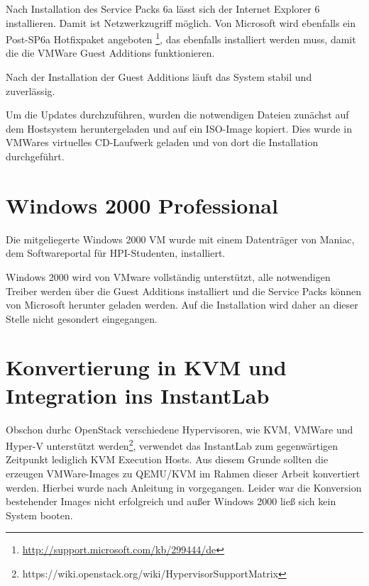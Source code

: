 	Nach Installation des Service Packs 6a lässt sich der Internet Explorer 6 installieren.
	Damit ist Netzwerkzugriff möglich. 
	Von Microsoft wird ebenfalls ein Post-SP6a Hotfixpaket angeboten \footnote{\url{http://support.microsoft.com/kb/299444/de}}, das ebenfalls installiert werden muss, damit die die VMWare Guest Additions funktionieren.


	Nach der Installation der Guest Additions läuft das System stabil und zuverlässig. 

	Um die Updates durchzuführen, wurden die notwendigen Dateien zunächst auf dem Hostsystem heruntergeladen und auf ein ISO-Image kopiert. Dies wurde in VMWares virtuelles CD-Laufwerk geladen und von dort die Installation durchgeführt.

\section{Windows 2000 Professional}

	Die mitgeliegerte Windows 2000 VM wurde mit einem Datenträger von Maniac, dem Softwareportal für HPI-Studenten, installiert.

	Windows 2000 wird von VMware vollständig unterstützt, alle notwendigen Treiber werden über die Guest Additions installiert und die Service Packs können von Microsoft herunter geladen werden.
	Auf die Installation wird daher an dieser Stelle nicht gesondert eingegangen.



\section{Konvertierung in KVM und Integration ins InstantLab}

	Obschon durhc OpenStack verschiedene Hypervisoren, wie KVM, VMWare und Hyper-V unterstützt werden\footnote{https://wiki.openstack.org/wiki/HypervisorSupportMatrix},
	verwendet das InstantLab zum gegenwärtigen Zeitpunkt lediglich KVM Execution Hosts.
	Aus diesem Grunde sollten die erzeugen VMWare-Images zu QEMU/KVM im Rahmen dieser Arbeit konvertiert werden.
	Hierbei wurde nach Anleitung in \cite{VMVDiskMan} vorgegangen. 
	Leider war die Konversion bestehender Images nicht erfolgreich und außer Windows 2000 ließ sich kein System booten.


